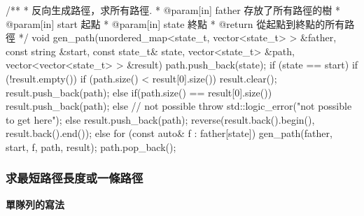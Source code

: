 \begin{Codex}[label=bfs_common.h]
/**
 * 反向生成路徑，求所有路徑.
 * @param[in] father 存放了所有路徑的樹
 * @param[in] start 起點
 * @param[in] state 終點
 * @return 從起點到終點的所有路徑
 */
void gen_path(unordered_map<state_t, vector<state_t> > &father,
        const string &start, const state_t& state, vector<state_t> &path,
        vector<vector<state_t> > &result) {
    path.push_back(state);
    if (state == start) {
        if (!result.empty()) {
            if (path.size() < result[0].size()) {
                result.clear();
                result.push_back(path);
            } else if(path.size() == result[0].size()) {
                result.push_back(path);
            } else {
                // not possible
                throw std::logic_error("not possible to get here");
            }
        } else {
            result.push_back(path);
        }
        reverse(result.back().begin(), result.back().end());
    } else {
        for (const auto& f : father[state]) {
            gen_path(father, start, f, path, result);
        }
    }
    path.pop_back();
}
\end{Codex}


\subsubsection{求最短路徑長度或一條路徑}

\textbf{單隊列的寫法}

